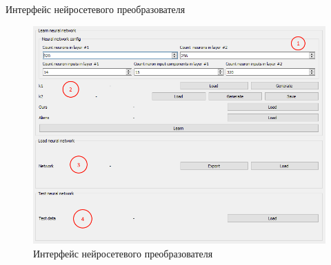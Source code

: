 \begin{frame}{Интерфейс нейросетевого преобразователя}
	\begin{figure}
        \includegraphics[width=\textwidth]{img/nn_interface.png}
        \caption{Интерфейс нейросетевого преобразователя}
    \end{figure}
\end{frame}
